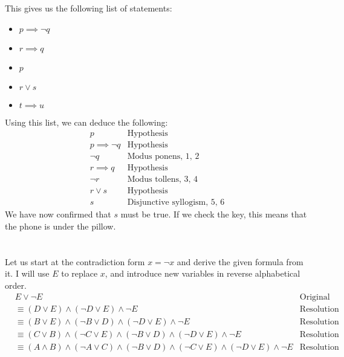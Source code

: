 \documentclass{article}
\begin{document}
This gives us the following list of statements:

\begin{itemize}
    \item[] $p \implies \neg q$
    \item[] $r \implies q$
    \item[] $p$
    \item[] $r \lor s$
    \item[] $t \implies u$
\end{itemize}
Using this list, we can deduce the following:
\begin{align}
     & p                 & \text{Hypothesis}                  & \\
     & p \implies \neg q & \text{Hypothesis}                  & \\
     & \neg q            & \text{Modus ponens, 1, 2}          & \\
     & r \implies q      & \text{Hypothesis}                  & \\
     & \neg r            & \text{Modus tollens, 3, 4}         & \\
     & r \lor s          & \text{Hypothesis}                  & \\
     & s                 & \text{Disjunctive syllogism, 5, 6} &
\end{align}
We have now confirmed that $s$ must be true. If we check the key, this means that
the phone is under the pillow.

\section{}
Let us start at the contradiction form $x = \neg x$ and derive the given
formula from it. I will use $E$ to replace $x$, and introduce new variables in
reverse alphabetical order.
\begin{align*}
     & E \lor \neg E                                                                                                           & \text{Original proposition} & \\
     & \equiv (D \lor E) \land (\neg D \lor E) \land \neg E                                                                    & \text{Resolution}           & \\
     & \equiv (B \lor E) \land (\neg B \lor D) \land (\neg D \lor E) \land \neg E                                              & \text{Resolution}           & \\
     & \equiv (C \lor B) \land (\neg C \lor E) \land (\neg B \lor D) \land (\neg D \lor E) \land \neg E                        & \text{Resolution}           & \\
     & \equiv (A \land B) \land (\neg A \lor C) \land (\neg B \lor D) \land (\neg C \lor E) \land (\neg D \lor E) \land \neg E & \text{Resolution}           &
\end{align*}
\end{document}
